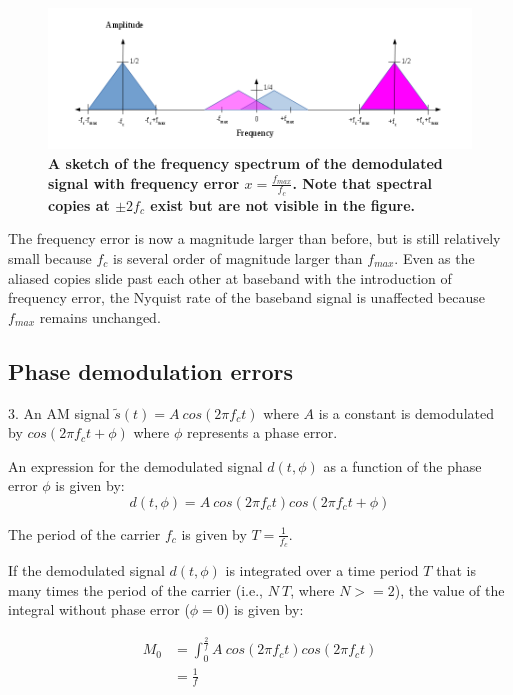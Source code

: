 \documentclass[letterpaper,12pt]{article}
\begin{document}
\begin{figure}[hbtp]
\includegraphics[width=1.0\columnwidth]{prelab1-figure2c}
\caption{
\label{fig:prelab1-figure2c}
{\bf  A sketch of the frequency spectrum of the demodulated signal with
frequency error $x=\frac{f_{max}}{f_{c}}$.  Note that spectral copies at
$\pm2f_{c}$ exist but are not visible in the figure.
}
}
\end{figure}

The frequency error is now a magnitude larger than before, but is still
relatively small because $f_{c}$ is several order of magnitude larger than
$f_{max}$. Even as the aliased copies slide past each other at baseband with
the introduction of frequency error, the Nyquist rate of the baseband signal is
unaffected because $f_{max}$ remains unchanged.
\pagebreak

\subsection*{Phase demodulation errors}

3. An AM signal $\tilde{s}(t)=A\ cos(2 \pi f_{c}t)$ where $A$ is a constant is
demodulated by $cos(2 \pi f_{c}t+\phi)$ where $\phi$ represents a phase error.

An expression for the demodulated signal $d(t,\phi)$ as a function of the phase
error $\phi$ is given by:
\begin{equation}
d(t,\phi)=A\ cos(2 \pi f_{c}t)cos(2 \pi f_{c}t+\phi)
\end{equation}

The period of the carrier $f_{c}$ is given by $T=\frac{1}{f_{c}}$.

If the demodulated signal $d(t,\phi)$ is integrated over a time period $T$ that
is many times the period of the carrier (i.e., $N\ T$, where $N >= 2$), the value
of the integral without phase error ($\phi=0$) is given by:

\begin{equation}
\begin{split}
M_{0} & = \int_{0}^{\frac{2}{f}}A\ cos(2\pi f_{c}t)cos(2\pi f_{c}t) \\
 & = \frac{1}{f}
\end{split}
\end{equation}
\end{document}
